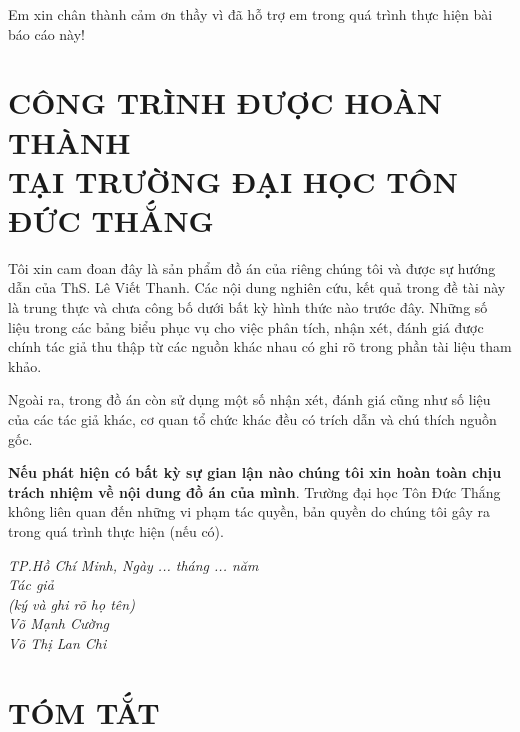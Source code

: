 \documentclass[13pt]{report}
\begin{document}
    Em xin chân thành cảm ơn thầy vì đã hỗ trợ em trong quá trình thực hiện bài báo cáo này!

    \newpage
    \section*{\centering CÔNG TRÌNH ĐƯỢC HOÀN THÀNH \\ TẠI TRƯỜNG ĐẠI HỌC TÔN ĐỨC THẮNG}
    Tôi xin cam đoan đây là sản phẩm đồ án của riêng chúng tôi và được sự hướng dẫn của ThS. Lê Viết Thanh. Các nội dung nghiên cứu, kết quả trong đề tài này là trung thực và chưa công bố dưới bất kỳ hình thức nào trước đây. Những số liệu trong các bảng biểu phục vụ cho việc phân tích, nhận xét, đánh giá được chính tác giả thu thập từ các nguồn khác nhau có ghi rõ trong phần tài liệu tham khảo.
    
    Ngoài ra, trong đồ án còn sử dụng một số nhận xét, đánh giá cũng như số liệu của các tác giả khác, cơ quan tổ chức khác đều có trích dẫn và chú thích nguồn gốc.
    
    \textbf{Nếu phát hiện có bất kỳ sự gian lận nào chúng tôi xin hoàn toàn chịu trách nhiệm về nội dung đồ án của mình}. Trường đại học Tôn Đức Thắng không liên quan đến những vi phạm tác quyền, bản quyền do chúng tôi gây ra trong quá trình thực hiện (nếu có).
    \begin{center}
    \textit{
        \hspace*{6cm}TP.Hồ Chí Minh, Ngày ... tháng ... năm \\
    	\hspace*{7cm}Tác giả\\
    	\hspace*{7cm}(ký và ghi rõ họ tên)\\
    	\vspace*{0.2cm}
    	\vspace*{2cm}
    	\hspace*{7cm}Võ Mạnh Cường\\
        \hspace*{7cm}Võ Thị Lan Chi\\
        \vspace*{0.2cm}
    }
    \end{center}
    \newpage
    \section*{\centering TÓM TẮT}
\end{document}
